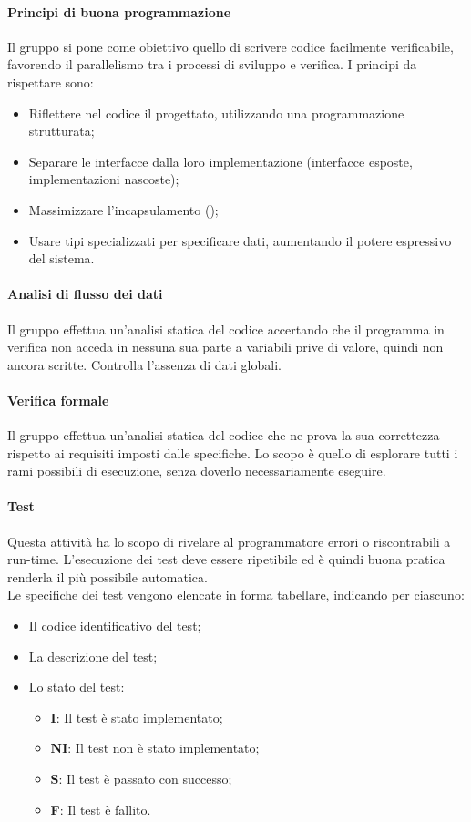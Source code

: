 \paragraph{Principi di buona programmazione}
Il gruppo si pone come obiettivo quello di scrivere codice facilmente verificabile, favorendo il parallelismo tra i processi di sviluppo e verifica. I principi da rispettare sono:
\begin{itemize}
	\item Riflettere nel codice il  progettato, utilizzando una programmazione strutturata;
	\item Separare le interfacce dalla loro implementazione (interfacce esposte, implementazioni nascoste);
	\item Massimizzare l'incapsulamento ();
	\item Usare tipi specializzati per specificare dati, aumentando il potere espressivo del sistema. 
\end{itemize}

\paragraph{Analisi di flusso dei dati} 
Il gruppo effettua un'analisi statica del codice accertando che il programma in verifica non acceda in nessuna sua parte a variabili prive di valore, quindi non ancora scritte. Controlla l'assenza di dati globali.

\paragraph{Verifica formale} 
Il gruppo effettua un'analisi statica del codice che ne prova la sua correttezza rispetto ai requisiti imposti dalle specifiche. Lo scopo è quello di esplorare tutti i rami possibili di esecuzione, senza doverlo necessariamente eseguire. 

\paragraph{Test} 
Questa attività ha lo scopo di rivelare al programmatore errori o  riscontrabili a run-time.
L'esecuzione dei test deve essere ripetibile ed è quindi buona pratica renderla il più possibile automatica. \\
Le specifiche dei test vengono elencate in forma tabellare, indicando per ciascuno: 
\begin{itemize}
	\item Il codice identificativo del test;
	\item La descrizione del test;
	\item Lo stato del test:
	\begin{itemize}
		\item \textbf{I}: Il test è stato implementato;
		\item \textbf{NI}: Il test non è stato implementato;
		\item \textbf{S}: Il test è passato con successo;
		\item \textbf{F}: Il test è fallito.
	\end{itemize}
\end{itemize}

